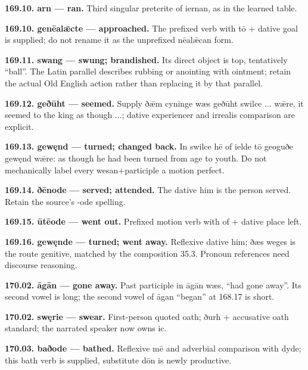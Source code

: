 \textbf{169.10. arn — ran.} Third singular preterite of iernan, as in the learned table.

\textbf{169.10. genēalǣcte — approached.} The prefixed verb with tō + dative goal is supplied; do not rename it as the unprefixed nēalǣcan form.

\textbf{169.11. swang — swung; brandished.} Its direct object is top, tentatively “ball”. The Latin parallel describes rubbing or anointing with ointment; retain the actual Old English action rather than replacing it by that parallel.

\textbf{169.12. geðūht — seemed.} Supply ðǣm cyninge wæs geðūht swilce ... wǣre, it seemed to the king as though ...; dative experiencer and irrealis comparison are explicit.

\textbf{169.13. gewęnd — turned; changed back.} In swilce hē of ielde tō geoguðe gewęnd wǣre: as though he had been turned from age to youth. Do not mechanically label every wesan+participle a motion perfect.

\textbf{169.14. ðēnode — served; attended.} The dative him is the person served. Retain the source’s -ode spelling.

\textbf{169.15. ūtēode — went out.} Prefixed motion verb with of + dative place left.

\textbf{169.16. gewęnde — turned; went away.} Reflexive dative him; ðæs weges is the route genitive, matched by the composition 35.3. Pronoun references need discourse reasoning.

\textbf{170.02. āgān — gone away.} Past participle in āgān wæs, “had gone away”. Its second vowel is long; the second vowel of āgan “began” at 168.17 is short.

\textbf{170.02. swęrie — swear.} First-person quoted oath; ðurh + accusative oath standard; the narrated speaker now owns ic.

\textbf{170.03. baðode — bathed.} Reflexive mē and adverbial comparison with dyde; this bath verb is supplied, substitute dōn is newly productive.

